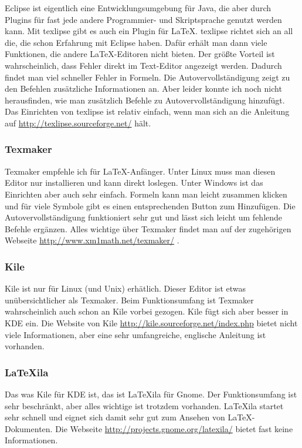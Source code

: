 Eclipse ist eigentlich eine Entwicklungsumgebung für Java, die aber durch Plugins für fast jede andere Programmier- und Skriptsprache genutzt werden kann. Mit texlipse gibt es auch ein Plugin für \LaTeX. texlipse richtet sich an all die, die schon Erfahrung mit Eclipse haben. Dafür erhält man dann viele Funktionen, die andere \LaTeX-Editoren nicht bieten. Der größte Vorteil ist wahrscheinlich, dass Fehler direkt im Text-Editor angezeigt werden. Dadurch findet man viel schneller Fehler in Formeln. Die Autovervollständigung zeigt zu den Befehlen zusätzliche Informationen an. Aber leider konnte ich noch nicht herausfinden, wie man zusätzlich Befehle zu Autovervollständigung hinzufügt.\\
Das Einrichten von texlipse ist relativ einfach, wenn man sich an die Anleitung auf \url{http://texlipse.sourceforge.net/} hält.

\subsubsection{Texmaker}

Texmaker empfehle ich für \LaTeX-Anfänger. Unter Linux muss man diesen Editor nur installieren und kann direkt loslegen. Unter Windows ist das Einrichten aber auch sehr einfach. Formeln kann man leicht zusammen klicken und für viele Symbole gibt es einen entsprechenden Button zum Hinzufügen. Die Autovervollständigung funktioniert sehr gut und lässt sich leicht um fehlende Befehle ergänzen. Alles wichtige über Texmaker findet man auf der zugehörigen Webseite \url{http://www.xm1math.net/texmaker/} .

\subsubsection{Kile}

Kile ist nur für Linux (und Unix) erhätlich. Dieser Editor ist etwas unübersichtlicher als Texmaker. Beim Funktionsumfang ist Texmaker wahrscheinlich auch schon an Kile vorbei gezogen. Kile fügt sich aber besser in KDE ein. Die Website von Kile \url{http://kile.sourceforge.net/index.php} bietet nicht viele Informationen, aber eine sehr umfangreiche, englische Anleitung ist vorhanden.

\subsubsection{LaTeXila}

Das was Kile für KDE ist, das ist LaTeXila für Gnome. Der Funktionsumfang ist sehr beschränkt, aber alles wichtige ist trotzdem vorhanden. LaTeXila startet sehr schnell und eignet sich damit sehr gut zum Ansehen von \LaTeX-Dokumenten. Die Webseite \url{http://projects.gnome.org/latexila/} bietet fast keine Informationen.

